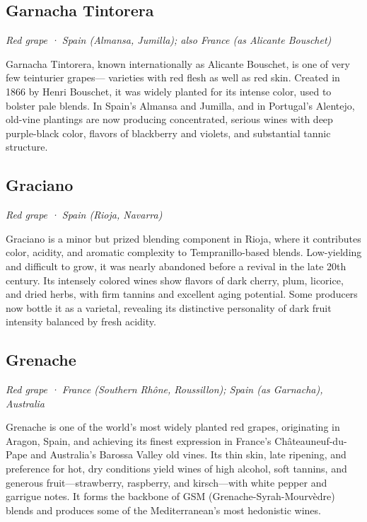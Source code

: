 \subsection*{Garnacha Tintorera}
\textit{Red grape · Spain (Almansa, Jumilla); also France (as Alicante Bouschet)}\par\smallskip

Garnacha Tintorera, known internationally as Alicante Bouschet, is one of very few teinturier grapes— varieties with red flesh as well as red skin. Created in 1866 by Henri Bouschet, it was widely planted for its intense color, used to bolster pale blends. In Spain’s Almansa and Jumilla, and in Portugal’s Alentejo, old-vine plantings are now producing concentrated, serious wines with deep purple-black color, flavors of blackberry and violets, and substantial tannic structure.

\subsection*{Graciano}
\textit{Red grape · Spain (Rioja, Navarra)}\par\smallskip

Graciano is a minor but prized blending component in Rioja, where it contributes color, acidity, and aromatic complexity to Tempranillo-based blends. Low-yielding and difficult to grow, it was nearly abandoned before a revival in the late 20th century. Its intensely colored wines show flavors of dark cherry, plum, licorice, and dried herbs, with firm tannins and excellent aging potential. Some producers now bottle it as a varietal, revealing its distinctive personality of dark fruit intensity balanced by fresh acidity.

\subsection*{Grenache}
\textit{Red grape · France (Southern Rhône, Roussillon); Spain (as Garnacha), Australia}\par\smallskip

Grenache is one of the world’s most widely planted red grapes, originating in Aragon, Spain, and achieving its finest expression in France’s Châteauneuf-du-Pape and Australia’s Barossa Valley old vines. Its thin skin, late ripening, and preference for hot, dry conditions yield wines of high alcohol, soft tannins, and generous fruit—strawberry, raspberry, and kirsch—with white pepper and garrigue notes. It forms the backbone of GSM (Grenache-Syrah-Mourvèdre) blends and produces some of the Mediterranean’s most hedonistic wines.

